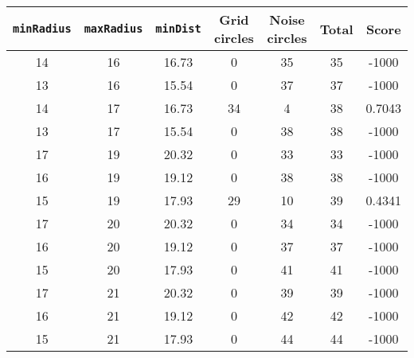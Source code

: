 \documentclass[letterpaper, 12pt]{article}
\begin{document}
\begin{longtable}{|c|c|c|c|c|c|c|}
\hline
\textbf{\texttt{minRadius}} & \textbf{\texttt{maxRadius}} & \textbf{\texttt{minDist}} & \textbf{Grid circles} & \textbf{Noise circles} & \textbf{Total} & \textbf{Score} \\
\hline
14 & 16 & 16.73 & 0 & 35 & 35 & -1000 \\
\hline
13 & 16 & 15.54 & 0 & 37 & 37 & -1000 \\
\hline
14 & 17 & 16.73 & 34 & 4 & 38 & 0.7043 \\
\hline
13 & 17 & 15.54 & 0 & 38 & 38 & -1000 \\
\hline
17 & 19 & 20.32 & 0 & 33 & 33 & -1000 \\
\hline
16 & 19 & 19.12 & 0 & 38 & 38 & -1000 \\
\hline
15 & 19 & 17.93 & 29 & 10 & 39 & 0.4341 \\
\hline
17 & 20 & 20.32 & 0 & 34 & 34 & -1000 \\
\hline
16 & 20 & 19.12 & 0 & 37 & 37 & -1000 \\
\hline
15 & 20 & 17.93 & 0 & 41 & 41 & -1000 \\
\hline
17 & 21 & 20.32 & 0 & 39 & 39 & -1000 \\
\hline
16 & 21 & 19.12 & 0 & 42 & 42 & -1000 \\
\hline
15 & 21 & 17.93 & 0 & 44 & 44 & -1000 \\
\hline
\end{longtable}
\end{document}

